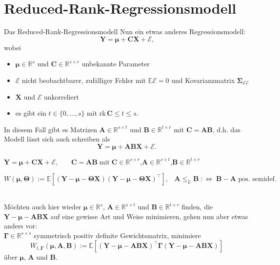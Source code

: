 \documentclass[12pt, aspectratio=169]{beamer}
\newcommand{\E}{\mathbb{E}}
\newcommand{\R}{\mathbb{R}}
\newcommand{\X}{\mathbf{X}}
\newcommand{\Y}{\mathbf{Y}}
\newcommand{\T}{\bm{\Theta}}
\newcommand{\muu}{\bm{\mu}}
\newcommand{\Ssigma}{\bm{\Sigma}}
\newcommand{\C}{\mathbf{C}}
\newcommand{\rk}{\mathrm{rk}}
\newcommand{\A}{\mathbf{A}}
\newcommand{\B}{\mathbf{B}}
\newcommand{\Ggamma}{\bm{\Gamma}}
\begin{document}
\section{Reduced-Rank-Regressionsmodell}

\begin{frame}{Das Reduced-Rank-Regressionsmodell}
	Nun ein etwas anderes Regressionsmodell:
	\[\Y = \muu + \C \X + \mathcal{E} \text{,}\]
	wobei
	\begin{itemize}
		\item $\muu \in \R^s$ und $\C \in \R^{s \times r}$ unbekannte Parameter
		\item $\mathcal{E}$ nicht beobachtbarer, zufälliger Fehler mit $\E \mathcal{E} = 0$ und Kovarianzmatrix $\Ssigma_{\mathcal{E} \mathcal{E}}$
		\item $\X$ und $\mathcal{E}$ unkorreliert
		\item es gibt ein $t \in \{0,\dots,s\}$ mit $ \rk \, \C \leq t \leq s \text{.}$
	\end{itemize}
	In diesem Fall gibt es Matrizen $\A \in \R^{s \times t}$ und $\B \in \R^{t \times r}$ mit $\C = \A \B$, d.h. das Modell
	lässt sich auch schreiben als
	\[\Y = \muu + \A \B \X + \mathcal{E} \text{.}\]
\end{frame}

\begin{frame}
\begin{alertblock}{}
	\begin{center}
		$\Y = \muu + \C \X + \mathcal{E}\text{,} \qquad \C = \A \B \; \text{mit} \; \C \in \R^{s \times r}\text{,} \A \in \R^{s \times t} \text{,} \B \in \R^{t \times r}$
	\end{center}
\end{alertblock}
\begin{alertblock}{}
	\begin{center}
		$W(\muu, \T) := \E[(\Y - \muu - \T \X)(\Y - \muu - \T \X)^\top] \text{,} \quad \A \leq_L \B \; :\Leftrightarrow \; \B - \A \text{ pos. semidef.}$
	\end{center}
\end{alertblock}
$\;$ \\
Möchten auch hier wieder $\muu \in \R^s$, $\A \in \R^{s \times t}$ und $\B \in \R^{t \times r}$ finden, die $\Y - \muu - \A \B \X$ auf eine gewisse Art und Weise minimieren, gehen nun aber etwas anders vor: \\
	$\Ggamma \in \R^{s \times s}$ symmetrisch positiv definite Gewichtsmatrix, minimiere 
	$$ W_{t, \Ggamma}(\muu, \A, \B) := \E[(\Y - \muu - \A \B \X)^{\top} \Ggamma (\Y - \muu - \A \B \X)]$$
	über $\muu$, $\A$ und $\B$.
\end{frame}
\end{document}
